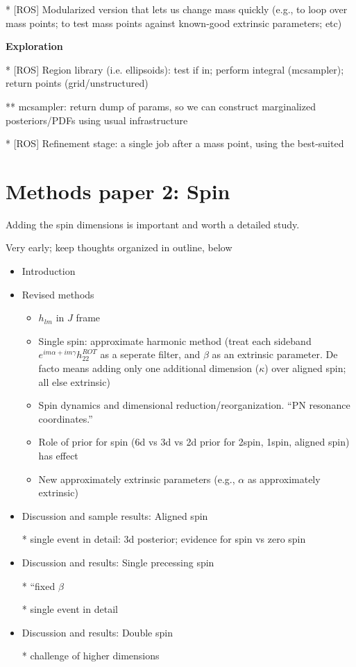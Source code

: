 * [ROS] Modularized version that lets us change mass quickly (e.g., to loop over mass points; to test mass points
against known-good extrinsic parameters; etc)


\noindent \textbf{Exploration}

* [ROS] Region library (i.e. ellipsoids): test if in; perform integral (mcsampler); return points (grid/unstructured)

** mcsampler: return dump of params, so we can construct marginalized posteriors/PDFs using usual infrastructure

* [ROS] Refinement stage: a single job after a mass point, using the best-suited

\section{Methods  paper 2: Spin}

Adding the spin dimensions is important and worth a detailed study.


Very early; keep thoughts organized in outline, below


\begin{itemize}

  \item Introduction
  \item Revised methods
    \begin{itemize}
        \item  $h_{lm}$ in $J$ frame
       \item  Single spin: approximate harmonic method (treat each sideband $e^{im\alpha+im\gamma}h_{22}^{ROT}$ as a
         seperate filter, and $\beta$ as an extrinsic parameter.  De facto means adding only one additional dimension
         ($\kappa$) over aligned spin;
         all else extrinsic)
        \item Spin dynamics and dimensional reduction/reorganization.  ``PN resonance coordinates.''
        \item Role of prior for spin (6d vs 3d vs 2d prior for 2spin, 1spin, aligned spin) has effect
        \item New approximately extrinsic parameters (e.g., $\alpha$ as approximately extrinsic)
    \end{itemize}

 \item Discussion and sample results: Aligned spin
     
   * single event in detail: 3d posterior; evidence for spin vs zero spin

 \item Discussion and results: Single precessing spin

   * ``fixed $\beta$

   * single event in detail

 \item Discussion and results: Double spin

  * challenge of higher dimensions
\end{itemize}
